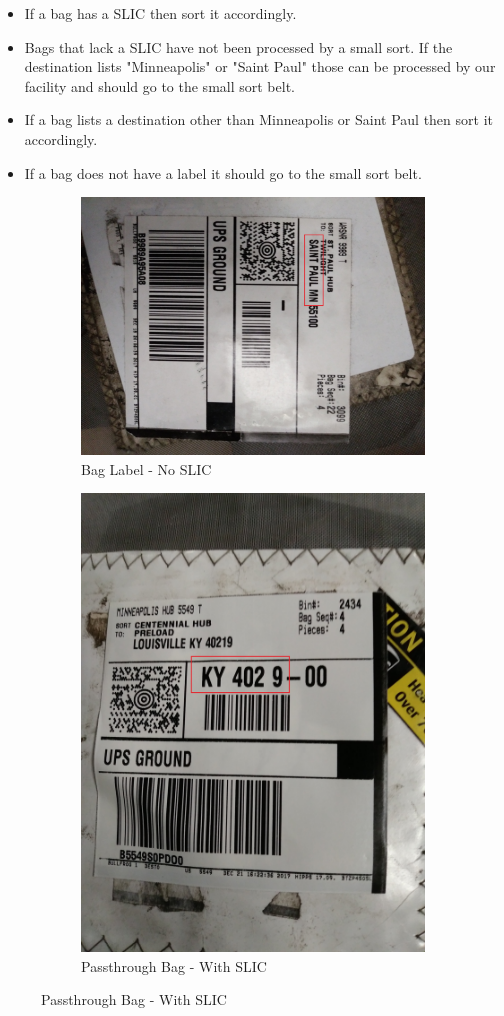 \documentclass[12pt]{article}
\begin{document}
\begin{itemize}
    \item If a bag has a SLIC then sort it accordingly.
    \item Bags that lack a SLIC have not been processed by a small sort. If the destination lists "Minneapolis" or "Saint Paul" those can be processed by our facility and should go to the small sort belt.
    \item If a bag lists a destination other than Minneapolis or Saint Paul then sort it accordingly.
    \item If a bag does not have a label it should go to the small sort belt.
\end{itemize}

\begin{figure}[H]
\begin{subfigure}{0.5\textwidth}
\centering
\includegraphics[width=0.5\linewidth]{20171221_171159} 
\caption{Bag Label - No SLIC}
\end{subfigure}
\begin{subfigure}{0.5\textwidth}
\centering
\includegraphics[width=0.5\linewidth]{20171221_162712}
\caption{Passthrough Bag - With SLIC}
\end{subfigure}

\end{figure}
\end{document}
